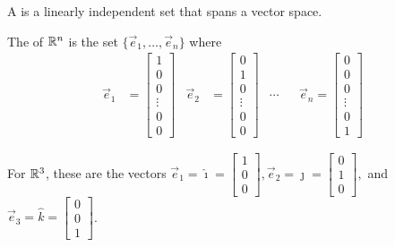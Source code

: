 \begin{definition}
  A  is a linearly independent set that spans a vector space.

  \vspace{1em}

  The  of \(\mathbb{R}^n\) is the set \(\{\vec{e}_1, \ldots, \vec{e}_n\}\) where
  \begin{align*}
  \vec{e}_1 &= \begin{bmatrix}1 \\ 0 \\ 0 \\ \vdots \\ 0 \\  0 \end{bmatrix} &
  \vec{e}_2 &= \begin{bmatrix}0 \\ 1 \\ 0 \\ \vdots \\ 0 \\ 0 \end{bmatrix} &
  \cdots & &
  \vec{e}_n = \begin{bmatrix}0 \\ 0 \\ 0 \\ \vdots \\ 0 \\ 1 \end{bmatrix}
  \end{align*}

  \vspace{1em}

  For \(\mathbb{R}^3\), these are the vectors
  \(
    \vec e_1=\hat\imath=\begin{bmatrix}1 \\ 0 \\ 0\end{bmatrix},
    \vec e_2=\hat\jmath=\begin{bmatrix}0 \\ 1 \\ 0\end{bmatrix},
  \) and \(
    \vec e_3=\hat k=\begin{bmatrix}0 \\ 0 \\ 1\end{bmatrix}
  \).

  \end{definition}

